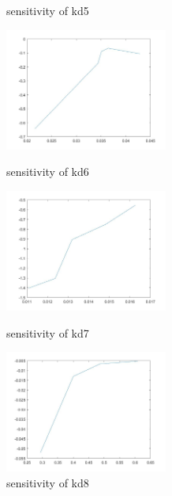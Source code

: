 \begin{figure}
\begin{varwidth}[t]{\textwidth}
	\end{varwidth}
	\caption{sensitivity of kd5}
	\begin{varwidth}[t]{\textwidth}
		\vspace{0pt}
		\includegraphics[height=4cm]{sd6.jpg}
	\end{varwidth}
	\caption{sensitivity of kd6}
	\begin{varwidth}[t]{\textwidth}
		\vspace{0pt}
		\includegraphics[height=4cm]{sd7.jpg}
	\end{varwidth}
	\caption{sensitivity of kd7}
	\begin{varwidth}[t]{\textwidth}
		\vspace{0pt}
		\includegraphics[height=4cm]{sd8.jpg}
	\end{varwidth}
	\caption{sensitivity of kd8}
\end{figure}






